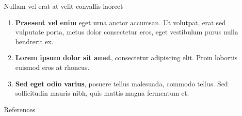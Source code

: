 \begin{columns}[t]
\begin{column}{\colwidth}
\begin{block}{Nullam vel erat at velit convallis laoreet}
    \begin{enumerate}
      \item \textbf{Praesent vel enim} eget urna auctor accumsan. Ut volutpat, erat sed vulputate porta, metus dolor consectetur eros, eget vestibulum purus nulla hendrerit ex.
      \item \textbf{Lorem ipsum dolor sit amet}, consectetur adipiscing elit. Proin lobortis euismod eros at rhoncus.
      \item \textbf{Sed eget odio varius}, posuere tellus malesuada, commodo tellus. Sed sollicitudin mauris nibh, quis mattis magna fermentum et.
    \end{enumerate}

  \end{block}

  \begin{block}{References}

    \nocite{*}
    \footnotesize{}

  \end{block}

\end{column}

\separatorcolumn
\end{columns}
